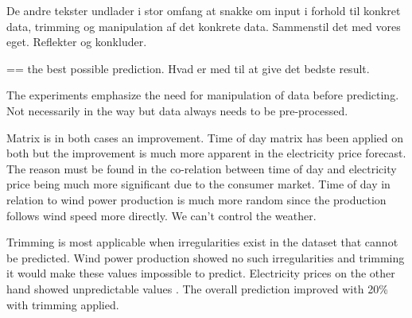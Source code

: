 De andre tekster undlader i stor omfang at snakke om input i forhold til konkret data, trimming og manipulation af det konkrete data. Sammenstil det med vores eget. Reflekter og konkluder.

== the best possible prediction. Hvad er med til at give det bedste result.

The experiments emphasize the need for manipulation of data before predicting. Not necessarily in the way but data always needs to be pre-processed.

Matrix is in both cases an improvement. Time of day matrix has been applied on both but the improvement is much more apparent in the electricity price forecast. The reason must be found in the co-relation between time of day and electricity price being much more significant due to the consumer market. Time of day in relation to wind power production is much more random since the production follows wind speed more directly. We can't control the weather. 

Trimming is most applicable when irregularities exist in the dataset that cannot be predicted. Wind power production showed no such irregularities and trimming it would make these values impossible to predict. Electricity prices on the other hand showed unpredictable values . The overall prediction improved with 20\% with trimming applied. 
